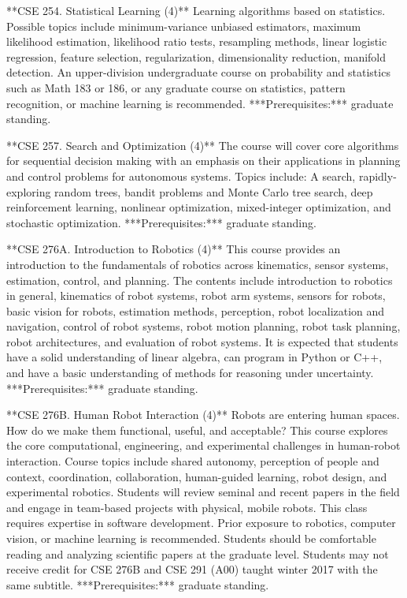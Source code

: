 \documentclass[11pt,letterpaper]{article}
\begin{document}
**CSE 254. Statistical Learning (4)** Learning algorithms based on
statistics. Possible topics include minimum-variance unbiased
estimators, maximum likelihood estimation, likelihood ratio tests,
resampling methods, linear logistic regression, feature selection,
regularization, dimensionality reduction, manifold detection. An
upper-division undergraduate course on probability and statistics such
as Math 183 or 186, or any graduate course on statistics, pattern
recognition, or machine learning is recommended. ***Prerequisites:***
graduate standing.

**CSE 257. Search and Optimization (4)** The course will cover core
algorithms for sequential decision making with an emphasis on their
applications in planning and control problems for autonomous
systems. Topics include: A\* search, rapidly-exploring random trees,
bandit problems and Monte Carlo tree search, deep reinforcement
learning, nonlinear optimization, mixed-integer optimization, and
stochastic optimization. ***Prerequisites:***
graduate standing.

**CSE 276A. Introduction to Robotics (4)** This course provides an
introduction to the fundamentals of robotics across kinematics, sensor
systems, estimation, control, and planning. The contents include
introduction to robotics in general, kinematics of robot systems, robot
arm systems, sensors for robots, basic vision for robots, estimation
methods, perception, robot localization and navigation, control of robot
systems, robot motion planning, robot task planning, robot
architectures, and evaluation of robot systems. It is expected that
students have a solid understanding of linear algebra, can program in
Python or C++, and have a basic understanding of methods for reasoning
under uncertainty. ***Prerequisites:*** graduate standing.

**CSE 276B. Human Robot Interaction (4)** Robots are entering human
spaces. How do we make them functional, useful, and acceptable? This
course explores the core computational, engineering, and experimental
challenges in human-robot interaction. Course topics include shared
autonomy, perception of people and context, coordination, collaboration,
human-guided learning, robot design, and experimental robotics. Students
will review seminal and recent papers in the field and engage in
team-based projects with physical, mobile robots. This class requires
expertise in software development. Prior exposure to robotics, computer
vision, or machine learning is recommended. Students should be
comfortable reading and analyzing scientific papers at the graduate
level. Students may not receive credit for CSE 276B and CSE 291 (A00)
taught winter 2017 with the same subtitle. ***Prerequisites:*** graduate
standing.
\end{document}

